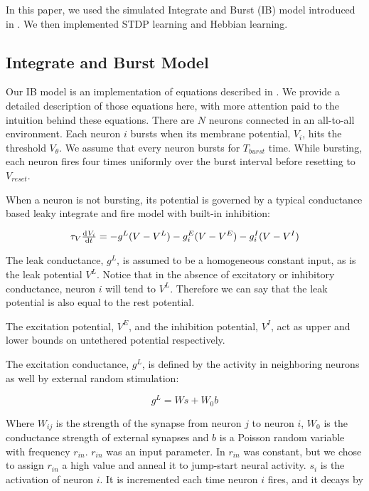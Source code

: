 In this paper, we used the simulated Integrate and Burst (IB) model introduced in \cite{Fiete}. We then implemented STDP learning and Hebbian learning.

\subsection{Integrate and Burst Model}

Our IB model is an implementation of equations described in \cite{Fiete}. We provide a detailed description of those equations here, with more attention paid to the intuition behind these equations. There are \(N\) neurons connected in an all-to-all environment. Each neuron \(i\) bursts when its membrane potential, \(V_i\), hits the threshold \(V_\theta\). We assume that every neuron bursts for \(T_{burst}\) time. While bursting, each neuron fires four times uniformly over the burst interval before resetting to \(V_{reset}\).

When a neuron is not bursting, its potential is governed by a typical conductance based leaky integrate and fire model with built-in inhibition:

\begin{equation}
\tau_V \od{V_i}{t} = -g^L(V - V^L) - g^E_i(V - V^E) - g^I_i(V - V^I)
\label{Potential}
\end{equation}

The leak conductance, \(g^L\), is assumed to be a homogeneous constant input, as is the leak potential \(V^L\). Notice that in the absence of excitatory or inhibitory conductance, neuron \(i\) will tend to \(V^L\). Therefore we can say that the leak potential is also equal to the rest potential.

The excitation potential, \(V^E\), and the inhibition potential, \(V^I\), act as upper and lower bounds on untethered potential respectively. 

The excitation conductance, \(g^L\), is defined by the activity in neighboring neurons as well by external random stimulation:

\[g^L = Ws + W_0b\]

Where \(W_{ij}\) is the strength of the synapse from neuron \(j\) to neuron \(i\), \(W_0\) is the conductance strength of external synapses and \(b\) is a Poisson random variable with frequency \(r_{in}\). \(r_{in}\) was an input parameter. In \cite{Fiete} \(r_{in}\) was constant, but we chose to assign \(r_{in}\) a high value and anneal it to jump-start neural activity. \(s_i\) is the activation of neuron \(i\). It is incremented each time neuron \(i\) fires, and it decays by

